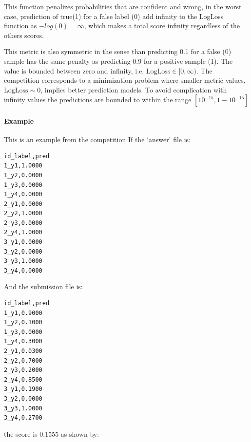 \documentclass[11pt]{article}
\begin{document}
This function penalizes probabilities that are confident and wrong, in
the worst case, prediction of true(1) for a false label (0) add infinity
to the LogLoss function as \(-log(0) = \infty\), which makes a total
score infinity regardless of the others scores.

This metric is also symmetric in the sense than predicting 0.1 for a
false (0) sample has the same penalty as predicting 0.9 for a positive
sample (1). The value is bounded between zero and infinity, i.e.
\(\textrm{LogLoss} \in [0, \infty)\). The competition corresponds to a
minimization problem where smaller metric values,
\(\textrm{LogLoss} \sim 0\), implies better prediction models. To avoid
complication with infinity values the predictions are bounded to within
the range \([10^{-15},1-10^{-15}]\)

    \hypertarget{example}{%
\paragraph{Example}\label{example}}

    This is an example from the competition If the `answer' file is:

\begin{verbatim}
id_label,pred
1_y1,1.0000
1_y2,0.0000
1_y3,0.0000
1_y4,0.0000
2_y1,0.0000
2_y2,1.0000
2_y3,0.0000
2_y4,1.0000
3_y1,0.0000
3_y2,0.0000
3_y3,1.0000
3_y4,0.0000
\end{verbatim}

And the submission file is:

\begin{verbatim}
id_label,pred
1_y1,0.9000
1_y2,0.1000
1_y3,0.0000
1_y4,0.3000
2_y1,0.0300
2_y2,0.7000
2_y3,0.2000
2_y4,0.8500
3_y1,0.1900
3_y2,0.0000
3_y3,1.0000
3_y4,0.2700
\end{verbatim}

the score is 0.1555 as shown by:
\end{document}
